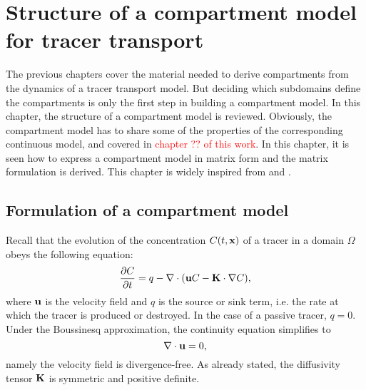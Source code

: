 \chapter{Structure of a compartment model for tracer transport} \label{chap:compartment}
The previous chapters cover the material needed to derive compartments from the dynamics of a tracer transport model. But deciding which subdomains define the compartments is only the first step in building a compartment model. In this chapter, the structure of a compartment model is reviewed. Obviously, the compartment model has to share some of the properties of the corresponding continuous model, and covered in \textcolor{red}{chapter ?? of this work}. In this chapter, it is seen how to express a compartment model in matrix form and the matrix formulation is derived. This chapter is widely inspired from \cite{deleersnijder2014compartment} and \cite{delhez2010compartment}.

\section{Formulation of a compartment model} \label{sec:fcm}
Recall that the evolution of the concentration $C(t,\mathbf x)$ of a tracer in a domain $\Omega$ obeys the following equation:
\begin{equation} \label{eq:continuousproblem}
	\frac{\partial C}{\partial t} = q - \nabla \cdot (\mathbf u C - \mathbf K \cdot \nabla C),
\end{equation}
where $\mathbf u$ is the velocity field and $q$ is the source or sink term, i.e. the rate at which the tracer is produced or destroyed. In the case of a passive tracer, $q = 0$. Under the Boussinesq approximation, the continuity equation simplifies to
\begin{equation}
	\nabla \cdot \mathbf u = 0,
\end{equation}
namely the velocity field is divergence-free. As already stated, the diffusivity tensor $\mathbf K$ is symmetric and positive definite.

